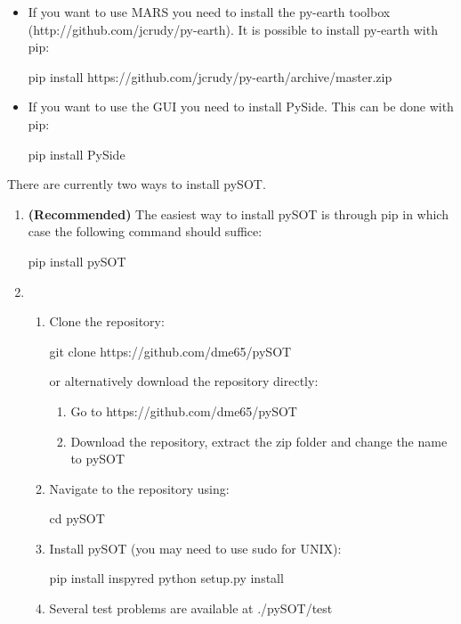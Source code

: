 \documentclass[]{article}
\begin{document}
\begin{itemize}
\item If you want to use MARS you need to install the py-earth toolbox 
\newline (http://github.com/jcrudy/py-earth). It is possible to install py-earth with pip:
\begin{python}
pip install https://github.com/jcrudy/py-earth/archive/master.zip
\end{python}
\item If you want to use the GUI you need to install PySide. This can be done with pip:
\begin{python}
pip install PySide
\end{python}
\end{itemize}

\noindent There are currently two ways to install pySOT.
\begin{enumerate}
\item \textbf{(Recommended)} The easiest way to install pySOT is through pip in which case 
the following command should suffice:
\begin{python}
pip install pySOT
\end{python}
\item 
\begin{enumerate}
\item Clone the repository: 
\begin{python}
git clone https://github.com/dme65/pySOT
\end{python} 
or alternatively download the repository directly:
\begin{enumerate}
\item Go to https://github.com/dme65/pySOT
\item Download the repository, extract the zip folder and change the name to pySOT
\end{enumerate}
\item Navigate to the repository using:
\begin{python}
cd pySOT
\end{python} 
\item Install pySOT (you may need to use sudo for UNIX):
\begin{python}
pip install inspyred
python setup.py install
\end{python} 
\item Several test problems are available at ./pySOT/test
\end{enumerate}
\end{enumerate}
\end{document}
